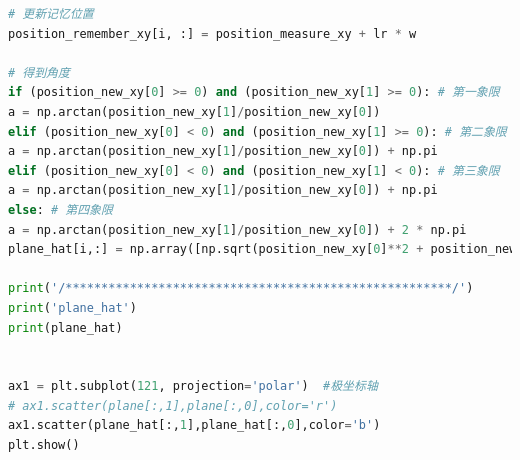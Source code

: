 \documentclass[withoutpreface,bwprint]{cumcmthesis} %
\begin{document}
\begin{lstlisting}[language=python]
# 更新记忆位置
position_remember_xy[i, :] = position_measure_xy + lr * w

# 得到角度
if (position_new_xy[0] >= 0) and (position_new_xy[1] >= 0): # 第一象限
a = np.arctan(position_new_xy[1]/position_new_xy[0])
elif (position_new_xy[0] < 0) and (position_new_xy[1] >= 0): # 第二象限
a = np.arctan(position_new_xy[1]/position_new_xy[0]) + np.pi
elif (position_new_xy[0] < 0) and (position_new_xy[1] < 0): # 第三象限
a = np.arctan(position_new_xy[1]/position_new_xy[0]) + np.pi
else: # 第四象限
a = np.arctan(position_new_xy[1]/position_new_xy[0]) + 2 * np.pi
plane_hat[i,:] = np.array([np.sqrt(position_new_xy[0]**2 + position_new_xy[1]**2),a])

print('/******************************************************/')
print('plane_hat')
print(plane_hat)


ax1 = plt.subplot(121, projection='polar')  #极坐标轴
# ax1.scatter(plane[:,1],plane[:,0],color='r')
ax1.scatter(plane_hat[:,1],plane_hat[:,0],color='b')
plt.show()


	\end{lstlisting}
\end{document}
